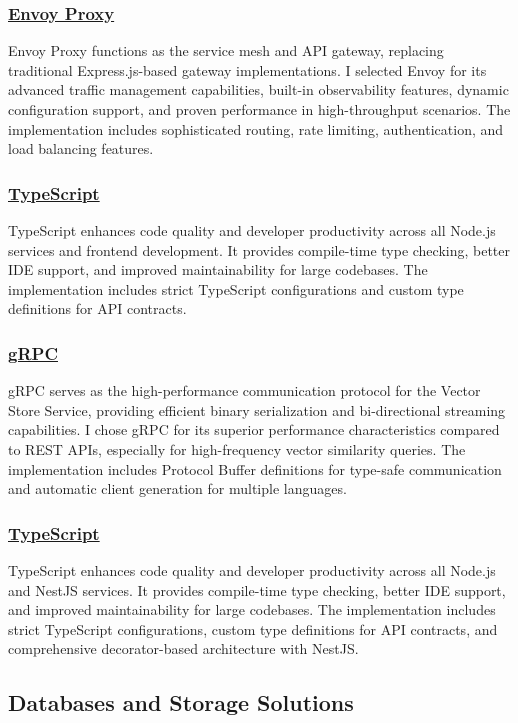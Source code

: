 \subsubsection*{\underline{Envoy Proxy}}
Envoy Proxy functions as the service mesh and API gateway, replacing traditional Express.js-based gateway implementations. I selected Envoy for its advanced traffic management capabilities, built-in observability features, dynamic configuration support, and proven performance in high-throughput scenarios. The implementation includes sophisticated routing, rate limiting, authentication, and load balancing features.

\subsubsection*{\underline{TypeScript}}
TypeScript enhances code quality and developer productivity across all Node.js services and frontend development. It provides compile-time type checking, better IDE support, and improved maintainability for large codebases. The implementation includes strict TypeScript configurations and custom type definitions for API contracts.

\subsubsection*{\underline{gRPC}}
gRPC serves as the high-performance communication protocol for the Vector Store Service, providing efficient binary serialization and bi-directional streaming capabilities. I chose gRPC for its superior performance characteristics compared to REST APIs, especially for high-frequency vector similarity queries. The implementation includes Protocol Buffer definitions for type-safe communication and automatic client generation for multiple languages.

\subsubsection*{\underline{TypeScript}}
TypeScript enhances code quality and developer productivity across all Node.js and NestJS services. It provides compile-time type checking, better IDE support, and improved maintainability for large codebases. The implementation includes strict TypeScript configurations, custom type definitions for API contracts, and comprehensive decorator-based architecture with NestJS.

\subsection{Databases and Storage Solutions}

